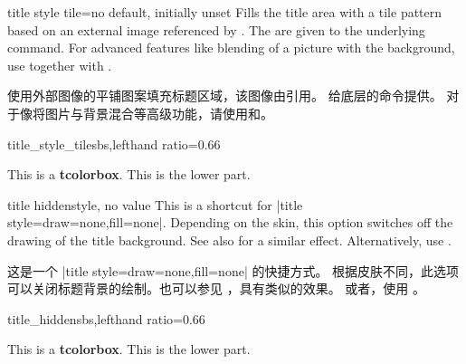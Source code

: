 \begin{docTcbKey}{title style tile}{=}{no default, initially unset}
Fills the title area with a tile pattern based on an external image referenced by .
The  are given to the underlying  command.
For advanced features like blending of a picture with the background,
use  together with .

使用外部图像的平铺图案填充标题区域，该图像由引用。 给底层的命令提供。 对于像将图片与背景混合等高级功能，请使用和。
\begin{exdispExample*}{title_style_tile}{sbs,lefthand ratio=0.66}

\begin{tcolorbox}[enhanced,title=My title,
title style tile={width=1cm}{pink_marble.png}]
This is a \textbf{tcolorbox}.
\tcblower
This is the lower part.
\end{tcolorbox}
\end{exdispExample*}
\end{docTcbKey}


\begin{docTcbKey}{title hidden}{}{style, no value}
This is a shortcut for |title style={draw=none,fill=none}|.
Depending on the skin, this option switches off the drawing of the
title background. See also  for a similar effect.
Alternatively, use .

这是一个 |title style={draw=none,fill=none}| 的快捷方式。 根据皮肤不同，此选项可以关闭标题背景的绘制。也可以参见 ，具有类似的效果。 或者，使用 。
\begin{exdispExample*}{title_hidden}{sbs,lefthand ratio=0.66}
\begin{tcolorbox}[title=My title,
enhanced,title hidden]
This is a \textbf{tcolorbox}.
\tcblower
This is the lower part.
\end{tcolorbox}
\end{exdispExample*}
\end{docTcbKey}

